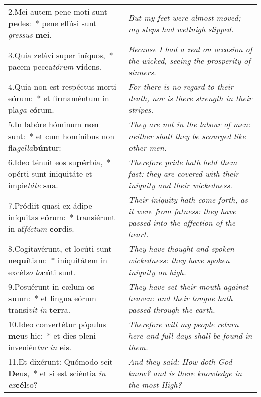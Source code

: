 \begin{longtable}{@{\hskip0pt} p{10cm} | p{6cm} @{\hskip0pt}}
2.\enspace Mei autem pene moti sunt \textbf{pe}des:~* pene effúsi sunt \textit{gres}\textit{sus} \textbf{me}i.
 & \textit{\small But my feet were almost moved; my steps had wellnigh slipped.
}\\
3.\enspace Quia zelávi super in\textbf{í}quos,~* pacem pecca\textit{tó}\textit{rum} \textbf{vi}dens.
 & \textit{\small Because I had a zeal on occasion of the wicked, seeing the prosperity of sinners.
}\\
4.\enspace Quia non est respéctus morti e\textbf{ó}rum:~* et firmaméntum in pla\textit{ga} \textit{e}\textbf{ó}rum.
 & \textit{\small For there is no regard to their death, nor is there strength in their stripes.
}\\
5.\enspace In labóre hóminum \textbf{non} sunt:~* et cum homínibus non fla\textit{gel}\textit{la}\textbf{bún}tur:
 & \textit{\small They are not in the labour of men: neither shall they be scourged like other men.
}\\
6.\enspace Ideo ténuit eos su\textbf{pér}bia,~* opérti sunt iniquitáte et impie\textit{tá}\textit{te} \textbf{su}a.
 & \textit{\small Therefore pride hath held them fast: they are covered with their iniquity and their wickedness.
}\\
7.\enspace Pródiit quasi ex ádipe iníquitas e\textbf{ó}rum:~* transiérunt in af\textit{féc}\textit{tum} \textbf{cor}dis.
 & \textit{\small Their iniquity hath come forth, as it were from fatness: they have passed into the affection of the heart.
}\\
8.\enspace Cogitavérunt, et locúti sunt ne\textbf{quí}tiam:~* iniquitátem in excél\textit{so} \textit{lo}\textbf{cú}ti sunt.
 & \textit{\small They have thought and spoken wickedness: they have spoken iniquity on high.
}\\
9.\enspace Posuérunt in cælum os \textbf{su}um:~* et lingua eórum transí\textit{vit} \textit{in} \textbf{ter}ra.
 & \textit{\small They have set their mouth against heaven: and their tongue hath passed through the earth.
}\\
10.\enspace Ideo convertétur pópulus \textbf{me}us hic:~* et dies pleni invenién\textit{tur} \textit{in} \textbf{e}is.
 & \textit{\small Therefore will my people return here and full days shall be found in them.
}\\
11.\enspace Et dixérunt: Quómodo scit \textbf{De}us,~* et si est sciéntia \textit{in} \textit{ex}\textbf{cél}so?
 & \textit{\small And they said: How doth God know? and is there knowledge in the most High?
}
\end{longtable}

